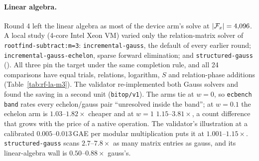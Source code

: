 \paragraph{Linear algebra.} Round 4 left the linear algebra as most of the
device arm's solve at $\lvert \mathcal{F}_x \rvert=4{,}096$. A local study (4-core Intel
Xeon VM) varied only the relation-matrix solver of
\texttt{rootfind-subtract:m=3}: \texttt{incremental-gauss}, the default of
every earlier round; \texttt{incremental-gauss-echelon}, sparse forward
elimination; and \texttt{structured-gauss}
(). All three pin the target
under the same completion rule, and all 24 comparisons have equal trials,
relations, logarithm, $S$ and relation-phase additions
(Table~\ref{tab:rf-la-m3}). The validator re-implemented both Gauss
solvers and found the saving in a second unit (\texttt{bitop/v1}). The
arms tie at $w=0$, so \texttt{ecbench band} rates every echelon/gauss pair
``unresolved inside the band''; at $w=0.1$ the echelon arm is
$1.03$--$1.82\times$ cheaper and at $w=1$ $1.15$--$3.81\times$, a count
difference that grows with the price of a native operation. The
validator's illustration at a calibrated $0.005$--$0.013$\,GAE per modular
multiplication puts it at $1.001$--$1.15\times$. \texttt{structured-gauss}
scans $2.7$--$7.8\times$ as many matrix entries as gauss, and its
linear-algebra wall is $0.50$--$0.88\times$ gauss's.

